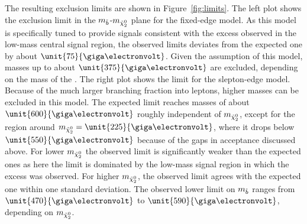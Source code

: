 The resulting exclusion limits are shown in Figure~\ref{fig:limits}. The left plot shows the exclusion limit in the $m_{\tilde{b}}$-$m_{{\tilde{\chi}^0_2}}$ plane for the fixed-edge model. As this model is specifically tuned to provide signals consistent with the excess observed in the low-mass central signal region, the observed limits deviates from the expected one by about $\unit{75}{\giga\electronvolt}$. Given the assumption of this model, \sbottom masses up to about $\unit{375}{\giga\electronvolt}$ are excluded, depending on the mass of the \secondchi. The right plot shows the limit for the slepton-edge model. Because of the much larger branching fraction into leptons, higher masses can be excluded in this model. The expected limit reaches \sbottom masses of about $\unit{600}{\giga\electronvolt}$ roughly independent of $m_{{\tilde{\chi}^0_2}}$, except for the region around $m_{\secondchi} = \unit{225}{\giga\electronvolt}$, where it drops below $\unit{550}{\giga\electronvolt}$ because of the gaps in acceptance discussed above. For lower $m_{{\tilde{\chi}^0_2}}$ the observed limit is significantly weaker than the expected ones as here the limit is dominated by the low-mass signal region in which the excess was observed. For higher $m_{{\tilde{\chi}^0_2}}$, the observed limit agrees with the expected one within one standard deviation. The observed lower limit on $m_{\tilde{b}}$ ranges from $\unit{470}{\giga\electronvolt}$ to $\unit{590}{\giga\electronvolt}$, depending on $m_{{\tilde{\chi}^0_2}}$.
